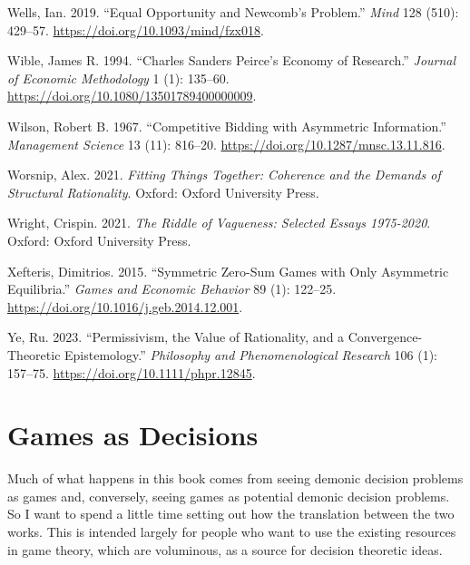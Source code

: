 \documentclass[
  12pt,
  letterpaper,
  DIV=11,
  numbers=noendperiod]{scrreprt}
\newlength{\cslhangindent}
\newlength{\cslentryspacingunit} %
\newenvironment{CSLReferences}[2] %
 {%
  \setlength{\parindent}{0pt}
  \ifodd #1
  \let\oldpar\par
  \def\par{\hangindent=\cslhangindent\oldpar}
  \fi
  \setlength{\parskip}{#2\cslentryspacingunit}
 }%
 {}
\begin{document}
\begin{CSLReferences}{1}{0}
\leavevmode{}%
Wells, Ian. 2019. {``Equal Opportunity and Newcomb's Problem.''}
\emph{Mind} 128 (510): 429--57.
\url{https://doi.org/10.1093/mind/fzx018}.

\leavevmode{}%
Wible, James R. 1994. {``Charles Sanders Peirce's Economy of
Research.''} \emph{Journal of Economic Methodology} 1 (1): 135--60.
\url{https://doi.org/10.1080/13501789400000009}.

\leavevmode{}%
Wilson, Robert B. 1967. {``Competitive Bidding with Asymmetric
Information.''} \emph{Management Science} 13 (11): 816--20.
\url{https://doi.org/10.1287/mnsc.13.11.816}.

\leavevmode{}%
Worsnip, Alex. 2021. \emph{Fitting Things Together: Coherence and the
Demands of Structural Rationality}. Oxford: Oxford University Press.

\leavevmode{}%
Wright, Crispin. 2021. \emph{The Riddle of Vagueness: Selected Essays
1975-2020}. Oxford: Oxford University Press.

\leavevmode{}%
Xefteris, Dimitrios. 2015. {``Symmetric Zero-Sum Games with Only
Asymmetric Equilibria.''} \emph{Games and Economic Behavior} 89 (1):
122--25. \url{https://doi.org/10.1016/j.geb.2014.12.001}.

\leavevmode{}%
Ye, Ru. 2023. {``Permissivism, the Value of Rationality, and a
Convergence-Theoretic Epistemology.''} \emph{Philosophy and
Phenomenological Research} 106 (1): 157--75.
\url{https://doi.org/10.1111/phpr.12845}.

\end{CSLReferences}

\cleardoublepage
{}
{}
\appendix

\hypertarget{sec-gad}{%
\chapter{Games as Decisions}\label{sec-gad}}

Much of what happens in this book comes from seeing demonic decision
problems as games and, conversely, seeing games as potential demonic
decision problems. So I want to spend a little time setting out how the
translation between the two works. This is intended largely for people
who want to use the existing resources in game theory, which are
voluminous, as a source for decision theoretic ideas.
\end{document}
